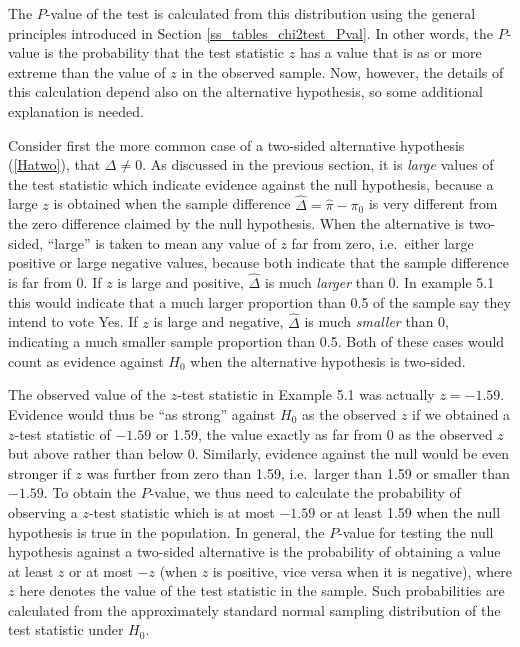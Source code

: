 The $P$-value of the test is calculated from this distribution using the
general principles introduced in Section \ref{ss_tables_chi2test_Pval}.
In other words, the $P$-value is the probability that the test statistic
$z$ has a value that is as or more extreme than the value of $z$ in the
observed sample. Now, however, the details of this calculation depend
also on the alternative hypothesis, so some additional explanation is
needed.

Consider first the more common case of a two-sided alternative
hypothesis (\ref{Hatwo}), that $\Delta\ne 0$. As discussed in the
previous section, it is \emph{large} values of the test statistic which
indicate evidence against the null hypothesis, because a large $z$ is
obtained when the sample difference $\hat{\Delta}=\hat{\pi}-\pi_{0}$ is
very different from the zero difference claimed by the null hypothesis.
When the alternative is two-sided, ``large'' is taken to mean any value
of $z$ far from zero, i.e.\ either large positive or large negative
values, because both indicate that the sample difference is far from 0.
If $z$ is large and positive, $\hat{\Delta}$ is much \emph{larger} than
0. In example 5.1 this would indicate that a much larger proportion than
0.5 of the sample say they intend to vote Yes. If $z$ is
large and negative, $\hat{\Delta}$ is much \emph{smaller} than 0,
indicating a much smaller sample proportion than 0.5. Both of these
cases would count as evidence against $H_{0}$ when the alternative
hypothesis is two-sided.

The observed value of the $z$-test statistic in Example 5.1 was actually
$z=-1.59$. Evidence would thus be ``as strong'' against $H_{0}$ as the
observed $z$ if we obtained a $z$-test statistic of $-1.59$ or 1.59, the
value exactly as far from 0 as the observed $z$ but above rather than
below 0. Similarly, evidence against the null would be even stronger if
$z$ was further from zero than 1.59, i.e.\ larger than 1.59 or smaller
than $-1.59$. To obtain the $P$-value, we thus need to calculate the
probability of observing a $z$-test statistic which is at most $-1.59$
or at least 1.59 when the null hypothesis is true in the population. In
general, the $P$-value for testing the null hypothesis against a
two-sided alternative is the probability of obtaining a value at least
$z$ or at most $-z$ (when $z$ is positive, vice versa when it is
negative), where $z$ here denotes the value of the test statistic in the
sample. Such probabilities are calculated from the approximately
standard normal sampling distribution of the test statistic under
$H_{0}$.

